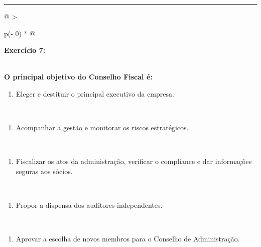 \documentclass[
]{book}
\providecommand{\tightlist}{%
  \setlength{\itemsep}{0pt}\setlength{\parskip}{0pt}}
\begin{document}
\begin{center}\rule{0.5\linewidth}{0.5pt}\end{center}

\begin{longtable}[]{@{}
  >{\raggedright\arraybackslash}p{(\columnwidth - 0\tabcolsep) * }@{}}
\toprule\noalign{}
\begin{minipage}[b]{\linewidth}\raggedright
\textbf{Exercício 7:}
\end{minipage} \\
\midrule\noalign{}
\endhead
\bottomrule\noalign{}
\endlastfoot
\textbf{O principal objetivo do Conselho Fiscal é:} \\
\begin{minipage}[t]{\linewidth}\raggedright
\begin{enumerate}
\def\labelenumi{\alph{enumi})}
\tightlist
\item
  Eleger e destituir o principal executivo da empresa.
\end{enumerate}
\end{minipage} \\
\begin{minipage}[t]{\linewidth}\raggedright
\begin{enumerate}
\def\labelenumi{\alph{enumi})}
\setcounter{enumi}{1}
\tightlist
\item
  Acompanhar a gestão e monitorar os riscos estratégicos.
\end{enumerate}
\end{minipage} \\
\begin{minipage}[t]{\linewidth}\raggedright
\begin{enumerate}
\def\labelenumi{\alph{enumi})}
\setcounter{enumi}{2}
\tightlist
\item
  Fiscalizar os atos da administração, verificar o compliance e dar informações seguras aos sócios.
\end{enumerate}
\end{minipage} \\
\begin{minipage}[t]{\linewidth}\raggedright
\begin{enumerate}
\def\labelenumi{\alph{enumi})}
\setcounter{enumi}{3}
\tightlist
\item
  Propor a dispensa dos auditores independentes.
\end{enumerate}
\end{minipage} \\
\begin{minipage}[t]{\linewidth}\raggedright
\begin{enumerate}
\def\labelenumi{\alph{enumi})}
\setcounter{enumi}{4}
\tightlist
\item
  Aprovar a escolha de novos membros para o Conselho de Administração.
\end{enumerate}
\end{minipage} \\
\end{longtable}
\end{document}
